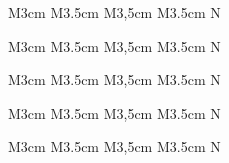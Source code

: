 
\begin{table}[ht] 
\begin{tabular}{ M{3cm} M{3.5cm} M{3,5cm} M{3.5cm} N }
\end{tabular}\end{table} 

\begin{table}[ht] 
\begin{tabular}{ M{3cm} M{3.5cm} M{3,5cm} M{3.5cm} N }
\end{tabular}\end{table} 

\begin{table}[ht] 
\begin{tabular}{ M{3cm} M{3.5cm} M{3,5cm} M{3.5cm} N }
\end{tabular}\end{table} 

\begin{table}[ht] 
\begin{tabular}{ M{3cm} M{3.5cm} M{3,5cm} M{3.5cm} N }
\end{tabular}\end{table} 

\begin{table}[ht] 
\begin{tabular}{ M{3cm} M{3.5cm} M{3,5cm} M{3.5cm} N }
\end{tabular}\end{table} 
\newpage